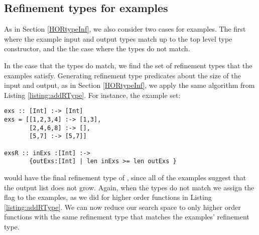 \subsection{Refinement types for examples}
As in Section \ref{HORtypeInf}, we also consider two cases for examples. The first where the example input and output types match up to the top level type constructor, and the the case where the types do not match.

In the case that the types do match, we find the set of refinement types that the examples satisfy. Generating refinement type predicates about the size of the input and output, as in Section \ref{HORtypeInf}, we apply the same algorithm from Listing \ref{listing:addRType}. For instance, the example set:

\begin{lstlisting}[caption=Refinement type inference for examples,label=exRTypeGen]
exs :: [Int] :-> [Int]
exs = [[1,2,3,4] :-> [1,3],
       [2,4,6,8] :-> [],
       [5,7] :-> [5,7]]
       
exsR :: inExs :[Int] :-> 
       {outExs:[Int] | len inExs >= len outExs }
\end{lstlisting}

\noindent would have the final refinement type of , since all of the examples suggest that the output list does not grow. 
Again, when the types do not match we assign the  flag to the examples, as we did for higher order functions in Listing \ref{listing:addRType}.
We can now reduce our search space to only higher order functions with the same refinement type that matches the examples' refinement type. 
